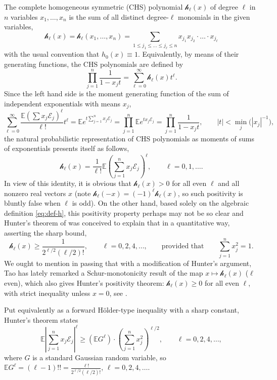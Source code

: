 \documentclass[10pt]{article}
\newcommand{\E}{\mathbb{E}}
\newcommand{\1}{\textbf{1}}
\newcommand{\cE}{\mathscr{E}}
\newcommand{\hh}{\mathscr{h}}
\theoremstyle{remark}
\theoremstyle{definition}
\begin{document}
The complete homogeneous symmetric (CHS) polynomial $\hh_\ell(x)$ of degree $\ell$ in $n$ variables $x_1, \dots, x_n$ is the sum of all distinct degree-$\ell$ monomials in the given variables,
\begin{equation}\label{eq:def-h}
\hh_\ell(x) = \hh_\ell(x_1, \dots, x_n) = \sum_{1 \leq j_1 \leq \dots \leq j_\ell \leq n} x_{j_1}x_{j_2}\cdot\ldots\cdot x_{j_\ell}
\end{equation}
with the usual convention that $h_0(x) \equiv 1$.
Equivalently, by means of their generating functions, the CHS polynomials are defined by
\[ 
\prod_{j=1}^n \frac{1}{1-x_jt} = \sum_{\ell=0}^\infty \hh_\ell(x)t^\ell.
 \]
Since the left hand side is the moment generating function of the sum of independent exponentials with means $x_j$,
\[ 
\sum_{\ell=0}^\infty \frac{\E(\sum x_j\cE_j)^\ell}{\ell!}t^\ell = \E e^{t\sum_{j=1}^n x_j\cE_j} = \prod_{j=1}^n \E e^{tx_j\cE_j} = \prod_{j=1}^n \frac{1}{1-x_jt}, \qquad |t| < \min_j \big(|x_j|^{-1}\big),
 \]
the natural probabilistic representation of CHS polynomials as moments of sums of exponentials presents itself as follows,
\[ 
\hh_\ell(x) = \frac{1}{\ell!}\E\left(\sum_{j=1}^n x_j\cE_j\right)^\ell, \qquad \ell = 0, 1, \dots.
 \]
In view of this identity, it is obvious that $\hh_\ell(x) > 0$ for all even $\ell$ and all nonzero real vectors $x$ (note $\hh_\ell(-x) = (-1)^\ell\hh_\ell(x)$, so such positivity is bluntly false when $\ell$ is odd). On the other hand, based solely on the algebraic definition \eqref{eq:def-h}, this positivity property perhaps may not be so clear and Hunter's theorem of \cite{Hun} was conceived to explain that in a quantitative way, asserting the sharp bound,
\[
\hh_\ell(x) \geq \frac{1}{2^{\ell/2}(\ell/2)!}, \qquad \ell = 0, 2, 4, \dots, \qquad \text{provided that} \qquad \sum_{j=1}^n x_j^2 = 1.
 \]
We ought to mention in passing that with a modification of Hunter's argument, Tao has lately remarked a Schur-monotonicity result of the map $x \mapsto \hh_\ell(x)$ ($\ell$ even), which also gives Hunter's positivity theorem: $\hh_\ell(x) \geq 0$ for all even $\ell$, with strict inequality unless $x = 0$, see \cite{Tao-blog}.

Put equivalently as a forward H\"older-type inequality with a sharp constant, Hunter's theorem states
\begin{equation}\label{eq:Hunter}
\E\left|\sum_{j=1}^n x_j\cE_j\right|^\ell \geq (\E G^{\ell})\cdot \left(\sum_{j=1}^n x_j^2\right)^{\ell/2}, \qquad \ell = 0, 2, 4, \dots,
\end{equation}
where $G$ is a standard Gaussian random variable, so $\E G^\ell = (\ell-1)!! = \frac{\ell!}{2^{\ell/2}(\ell/2)!}$, $\ell = 0, 2, 4, \dots$.
\end{document}
